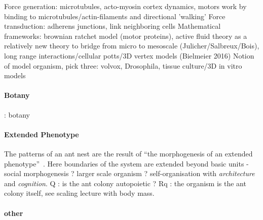\documentclass[fleqn,10pt]{wlscirep}
\begin{document}
Force generation: microtubules, acto-myosin cortex dynamics, motors work by binding to microtubules/actin-filaments and directional 'walking'
Force transduction: adherens junctions, link neighboring cells
Mathematical frameworks: brownian ratchet model (motor proteins), active fluid theory as a relatively new theory to bridge from micro to mesoscale (Julicher/Salbreux/Bois), long range interactions/cellular potts/3D vertex models (Bielmeier 2016)
Notion of model organism, pick three: volvox, Drosophila, tissue culture/3D in vitro models 

\paragraph{Botany}

\cite{lord1981cleistogamy} : botany

\paragraph{Extended Phenotype}

The patterns of an ant nest are the result of ``the morphogenesis of an extended phenotype''~\cite{minter2012morphogenesis}. Here boundaries of the system are extended beyond basic units - social morphogenesis ? larger scale organism ? self-organisation with \emph{architecture} and \emph{cognition}. Q : is the ant colony autopoietic ? Rq : the organism is the ant colony itself, see scaling lecture with body mass.


\paragraph{other}


\cite{han2016coordinating}
\end{document}
